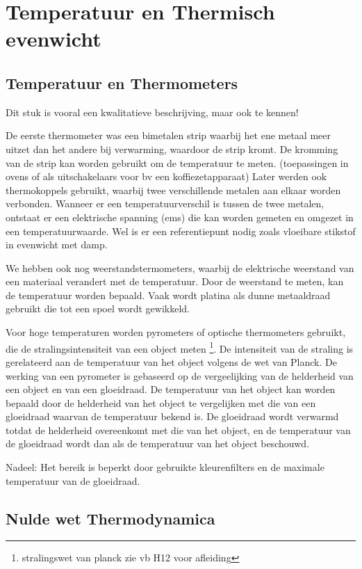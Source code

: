 \section{Temperatuur en Thermisch evenwicht}

\subsection{Temperatuur en Thermometers}

Dit stuk is vooral een kwalitatieve beschrijving, maar ook te kennen!

De eerste thermometer was een bimetalen strip waarbij het ene metaal meer uitzet dan het andere bij verwarming, waardoor de strip kromt. De kromming van de strip kan worden gebruikt om de temperatuur te meten. (toepassingen in ovens of als uitschakelaars voor bv een koffiezetapparaat)
Later werden ook thermokoppels gebruikt, waarbij twee verschillende metalen aan elkaar worden verbonden. Wanneer er een temperatuurverschil is tussen de twee metalen, ontstaat er een elektrische spanning (ems) die kan worden gemeten en omgezet in een temperatuurwaarde. Wel is er een referentiepunt nodig zoals vloeibare stikstof in evenwicht met damp.

We hebben ook nog weerstandstermometers, waarbij de elektrische weerstand van een materiaal verandert met de temperatuur. Door de weerstand te meten, kan de temperatuur worden bepaald. Vaak wordt platina als dunne metaaldraad gebruikt die tot een spoel wordt gewikkeld.

Voor hoge temperaturen worden pyrometers of optische thermometers gebruikt, die de stralingsintensiteit van een object meten \footnote{stralingswet van planck zie vb H12 voor afleiding}. De intensiteit van de straling is gerelateerd aan de temperatuur van het object volgens de wet van Planck.
De werking van een pyrometer is gebaseerd op de vergeelijking van de helderheid van een object en van een gloeidraad. De temperatuur van het object kan worden bepaald door de helderheid van het object te vergelijken met die van een gloeidraad waarvan de temperatuur bekend is. De gloeidraad wordt verwarmd totdat de helderheid overeenkomt met die van het object, en de temperatuur van de gloeidraad wordt dan als de temperatuur van het object beschouwd.

Nadeel: Het bereik is beperkt door gebruikte kleurenfilters en de maximale temperatuur van de gloeidraad.

\subsection{Nulde wet Thermodynamica}


